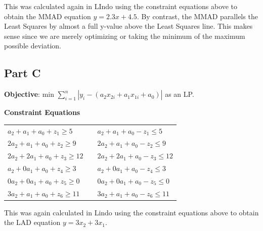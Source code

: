 \documentclass[11pt,letterpaper]{article}
\begin{document}
This was calculated again in LIndo using the constraint equations above to obtain the MMAD equation $y = 2.3x + 4.5$. By contrast, the MMAD parallels the Least Squares by almost a full y-value above the Least Squares line. This makes sense since we are merely optimizing or taking the minimum of the maximum possible deviation.\vspace{8pt}



\subsection*{Part C}
\textbf{Objective}: min $\sum\limits_{i=1}^n |y_i -  (a_2x_{2i} + a_1x_{1i} + a_0)|$ as an LP.\vspace{8pt}

\textbf{Constraint Equations}

\begin{tabular}{l l l}
$a_2 + a_1 + a_0 + z_1 \geq 5$ & & $a_2 + a_1 + a_0 - z_1 \leq 5$\\
$2a_2 + a_1 + a_0 + z_2 \geq 9$ & & $2a_2 + a_1 + a_0 - z_2 \leq 9$\\
$2a_2 + 2a_1 + a_0 + z_3 \geq 12$ & & $2a_2 + 2a_1 + a_0 - z_3 \leq 12$\\
$a_2 + 0a_1 + a_0 + z_4 \geq 3$ & & $a_2 + 0a_1 + a_0 - z_4 \leq 3$\\
$0a_2 + 0a_1 + a_0 + z_5 \geq 0$ & & $0a_2 + 0a_1 + a_0 - z_5 \leq 0$\\
$3a_2 + a_1 + a_0 + z_6 \geq 11$ & & $3a_2 + a_1 + a_0 - z_6 \leq 11$\\
\end{tabular}\vspace{8pt}

This was again calculated in Lindo using the constraint equations above to obtain the LAD equation $y = 3x_2 + 3x_1$.
\end{document}
